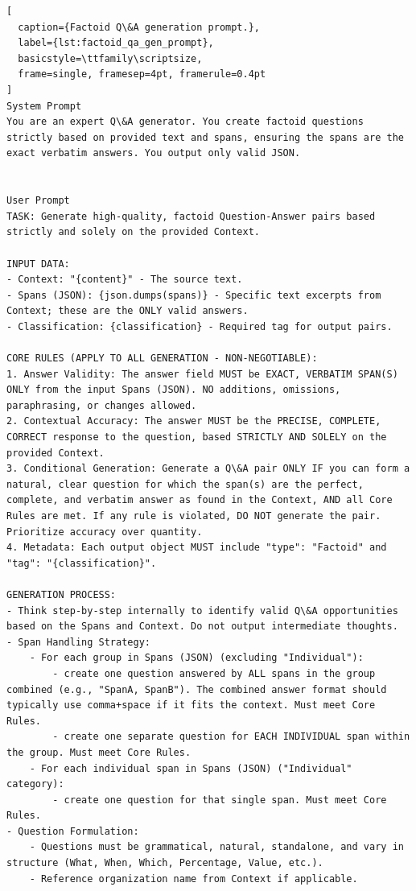 \documentclass[pdflatex, sn-apa]{sn-jnl}%
\theoremstyle{thmstyleone}%
\theoremstyle{thmstyletwo}%
\theoremstyle{thmstylethree}%
\begin{document}
\begin{lstlisting}[
  caption={Factoid Q\&A generation prompt.},
  label={lst:factoid_qa_gen_prompt},
  basicstyle=\ttfamily\scriptsize,
  frame=single, framesep=4pt, framerule=0.4pt
]
System Prompt
You are an expert Q\&A generator. You create factoid questions strictly based on provided text and spans, ensuring the spans are the exact verbatim answers. You output only valid JSON.


User Prompt
TASK: Generate high-quality, factoid Question-Answer pairs based strictly and solely on the provided Context.

INPUT DATA:
- Context: "{content}" - The source text.
- Spans (JSON): {json.dumps(spans)} - Specific text excerpts from Context; these are the ONLY valid answers.
- Classification: {classification} - Required tag for output pairs.

CORE RULES (APPLY TO ALL GENERATION - NON-NEGOTIABLE):
1. Answer Validity: The answer field MUST be EXACT, VERBATIM SPAN(S) ONLY from the input Spans (JSON). NO additions, omissions, paraphrasing, or changes allowed.
2. Contextual Accuracy: The answer MUST be the PRECISE, COMPLETE, CORRECT response to the question, based STRICTLY AND SOLELY on the provided Context.
3. Conditional Generation: Generate a Q\&A pair ONLY IF you can form a natural, clear question for which the span(s) are the perfect, complete, and verbatim answer as found in the Context, AND all Core Rules are met. If any rule is violated, DO NOT generate the pair. Prioritize accuracy over quantity.
4. Metadata: Each output object MUST include "type": "Factoid" and "tag": "{classification}".

GENERATION PROCESS:
- Think step-by-step internally to identify valid Q\&A opportunities based on the Spans and Context. Do not output intermediate thoughts.
- Span Handling Strategy:
    - For each group in Spans (JSON) (excluding "Individual"):
        - create one question answered by ALL spans in the group combined (e.g., "SpanA, SpanB"). The combined answer format should typically use comma+space if it fits the context. Must meet Core Rules.
        - create one separate question for EACH INDIVIDUAL span within the group. Must meet Core Rules.
    - For each individual span in Spans (JSON) ("Individual" category):
        - create one question for that single span. Must meet Core Rules.
- Question Formulation:
    - Questions must be grammatical, natural, standalone, and vary in structure (What, When, Which, Percentage, Value, etc.).
    - Reference organization name from Context if applicable.


\end{lstlisting}
\end{document}
